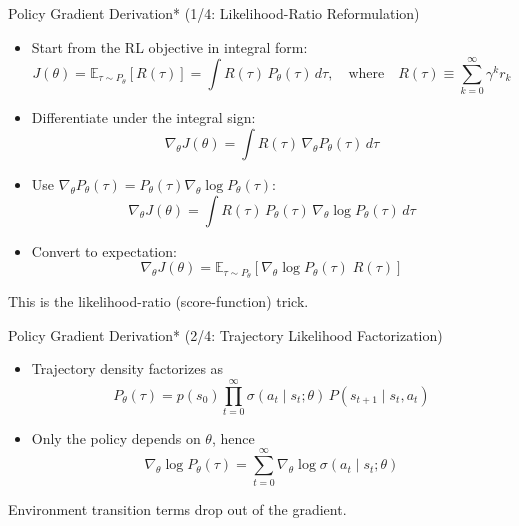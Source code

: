 \documentclass[aspectratio=169]{beamer}
\newcommand{\1}{\mathbf{1}}
\begin{document}
\begin{frame}{Policy Gradient Derivation* (1/4: Likelihood-Ratio Reformulation)}
    \small
    \begin{itemize}
        \item Start from the RL objective in integral form:
        \[
            J(\theta)
            =
            \mathbb{E}_{\tau \sim P_\theta}[R(\tau)]
            =
            \int R(\tau)\, P_\theta(\tau)\, d\tau, \quad \text{where} \quad R(\tau) \equiv \sum_{k=0}^{\infty} \gamma^k r_k
        \]

        \item Differentiate under the integral sign:
        \[
            \nabla_\theta J(\theta)
            =
            \int R(\tau)\, \nabla_\theta P_\theta(\tau)\, d\tau
        \]
        \item Use $\nabla_\theta P_\theta(\tau) = P_\theta(\tau) \nabla_\theta \log P_\theta(\tau)$:
        \[
            \nabla_\theta J(\theta)
            =
            \int R(\tau)\, P_\theta(\tau)\, \nabla_\theta \log P_\theta(\tau)\, d\tau
        \]
        \item Convert to expectation:
        \[
            \nabla_\theta J(\theta)
            =
            \mathbb{E}_{\tau \sim P_\theta}
            \left[
                \nabla_\theta \log P_\theta(\tau)\; R(\tau)
            \right]
        \]
    \end{itemize}
    This is the likelihood-ratio (score-function) trick.
\end{frame}
    
\begin{frame}{Policy Gradient Derivation* (2/4: Trajectory Likelihood Factorization)}
\small
\begin{itemize}
    \item Trajectory density factorizes as
    \[
        P_\theta(\tau)
        =
        p(s_0)
        \prod_{t=0}^{\infty}
        \sigma(a_t \mid s_t;\theta)
        \, P(s_{t+1} \mid s_t,a_t)
    \]
    \item Only the policy depends on $\theta$, hence
    \[
        \nabla_\theta \log P_\theta(\tau)
        =
        \sum_{t=0}^{\infty}
        \nabla_\theta \log \sigma(a_t \mid s_t;\theta)
    \]
\end{itemize}

Environment transition terms drop out of the gradient.
\end{frame}
    
\end{document}
